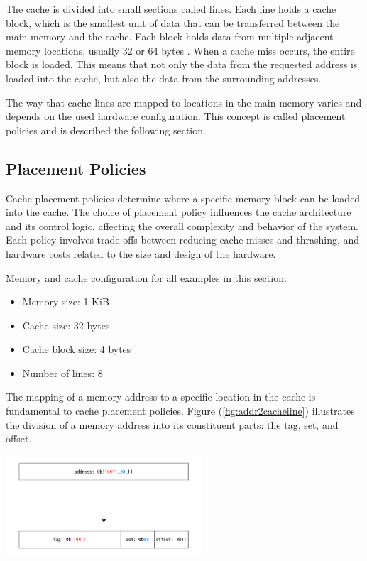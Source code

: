 \noindent The cache is divided into small sections called lines. Each line holds a cache block, which is the smallest unit of data that can be transferred between the main memory
and the cache. Each block holds data from multiple adjacent memory locations, usually 32 or 64 bytes \cite{comparchaquant}. When a cache miss occurs, the entire block is loaded.
This means that not only the data from the requested address is loaded into the cache, but also the data from the surrounding addresses.

The way that cache lines are mapped to locations in the main memory varies and depends on the used hardware configuration. This concept is called placement policies and is
described the following section.

\subsection{Placement Policies} \label{sec:placement}
Cache placement policies determine where a specific memory block can be loaded into the cache. The choice of placement policy influences the cache architecture and its control
logic, affecting the overall complexity and behavior of the system. Each policy involves trade-offs between reducing cache misses and thrashing, and hardware costs related to the
size and design of the hardware.

\vspace{10px}
\noindent Memory and cache configuration for all examples in this section:
\begin{itemize}
	\item Memory size: 1 KiB
	\item Cache size: 32 bytes
	\item Cache block size: 4 bytes
	\item Number of lines: 8
\end{itemize}

\vspace{10px}
\noindent The mapping of a memory address to a specific location in the cache is fundamental to cache placement policies. Figure (\ref{fig:addr2cacheline}) illustrates the division
of a memory address into its constituent parts: the tag, set, and offset.

\begin{center}
	\centering
	\includegraphics[width=0.55\textwidth]{figures/02-background/caches-addr_to_cache_line_loc.pdf}
	\label{fig:addr2cacheline}
\end{center}

